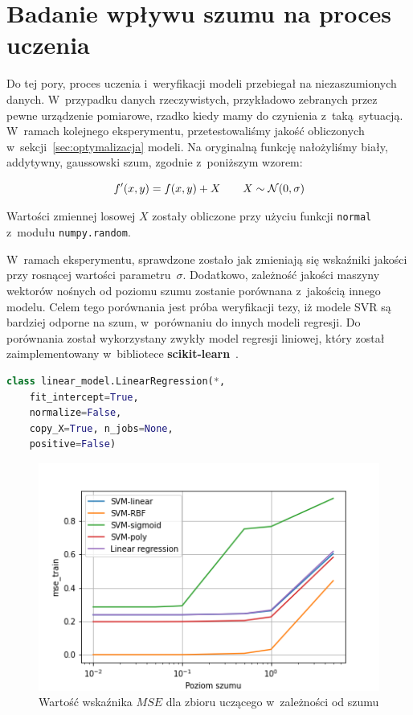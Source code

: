 \section{Badanie wpływu szumu na proces uczenia}
\label{sec:szum}

Do tej pory, proces uczenia i~weryfikacji modeli przebiegał na niezaszumionych danych. W~przypadku danych rzeczywistych, przykładowo zebranych przez pewne urządzenie pomiarowe, rzadko kiedy mamy do czynienia z~taką sytuacją. W~ramach kolejnego eksperymentu, przetestowaliśmy jakość obliczonych w~sekcji~\ref{sec:optymalizacja} modeli. Na oryginalną funkcję nałożyliśmy biały, addytywny, gaussowski szum, zgodnie z~poniższym wzorem:

\begin{equation}
    f'(x,y) = f(x,y) + X \qquad X \sim \mathcal{N}(0, \sigma)\smallskip
\end{equation}

Wartości zmiennej losowej $X$ zostały obliczone przy użyciu funkcji \texttt{normal} z~modułu \texttt{numpy.random}.

W~ramach eksperymentu, sprawdzone zostało jak zmieniają się wskaźniki jakości przy rosnącej wartości parametru~$\sigma$. Dodatkowo, zależność jakości maszyny wektorów nośnych od poziomu szumu zostanie porównana z~jakością innego modelu. Celem tego porównania jest próba weryfikacji tezy, iż modele SVR są bardziej odporne na szum, w~porównaniu do innych modeli regresji. Do porównania został wykorzystany zwykły model regresji liniowej, który został zaimplementowany w~bibliotece \textbf{scikit-learn}~\cite{scikit-learn}.

\begin{lstlisting}[language=Python, captionpos=b, caption=Nagłówek klasy \texttt{LinearRegression}]
class linear_model.LinearRegression(*, 
    fit_intercept=True, 
    normalize=False, 
    copy_X=True, n_jobs=None, 
    positive=False)
\end{lstlisting}

\begin{figure}[h]
    \centering
    \includegraphics[width=1.1\columnwidth]{assets/mse_train.png}
    \caption{Wartość wskaźnika $MSE$ dla zbioru uczącego w~zależności od szumu}
    \label{fig:noise-mse-train}
\end{figure}


